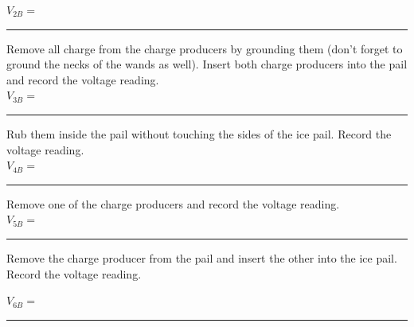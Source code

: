{{{\vspace{0.5cm}

\hspace{4cm}$V_{2B}=$\rule{5.0cm}{0.1mm}

\vspace{0.5cm}
 \noindent Remove all charge from the charge producers by grounding
 them (don't forget to ground the necks of the wands as well).
 Insert both charge producers into the pail and record the voltage reading.\\

\vspace{1cm}
  \hspace{4cm}$V_{3B}=$\rule{5.0cm}{.1mm}
\vspace{0.5cm}

 \noindent Rub them inside the pail without touching the sides of the ice pail. Record the voltage
 reading.\\

\vspace{1.0cm}
  \hspace{4cm}$V_{4B}=$\rule{5.0cm}{.1mm}

\vspace{0.5cm}
 \noindent Remove one of the charge producers and
record the voltage reading.\\

\vspace{1cm}
  \hspace{4cm}$V_{5B}=$\rule{5.0cm}{.1mm}

\vspace{0.5cm}


\noindent Remove the charge producer from the pail and insert the
other into the ice pail.  Record the voltage reading.



\vspace{1cm}
  \hspace{4cm}$V_{6B}=$\rule{5.0cm}{.1mm}


}}}
